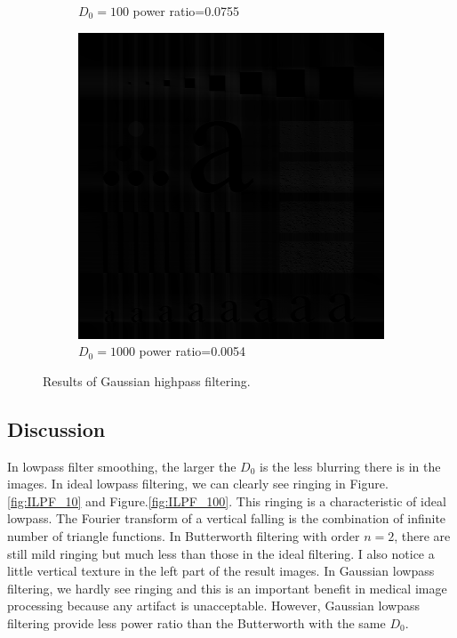 \begin{figure}[h!]
\begin{subfigure}[b]{0.3\linewidth}
		\caption{$D_0=100$ power ratio=0.0755}
		\label{fig:GHPF_100}
	\end{subfigure}
	\begin{subfigure}[b]{0.3\linewidth}
		\includegraphics[width=\linewidth]{myfigure/p3/GHPF_1000.png}
		\caption{$D_0=1000$ power ratio=0.0054}
		\label{fig:GHPF_1000}
	\end{subfigure}
  	\caption{Results of Gaussian highpass filtering.}
  	\label{fig:GHPF}
\end{figure}


\subsection{Discussion}
In lowpass filter smoothing, the larger the $D_0$ is the less blurring there is in the images. In ideal lowpass filtering, we can clearly see ringing in Figure.\ref{fig:ILPF_10} and Figure.\ref{fig:ILPF_100}. This ringing is a characteristic of ideal lowpass. The Fourier transform of a vertical falling is the combination of infinite number of triangle functions. In Butterworth filtering with order $n=2$, there are still mild ringing but much less than those in the ideal filtering. I also notice a little vertical texture in the left part of the result images. In Gaussian lowpass filtering, we hardly see ringing and this is an important benefit in medical image processing because any artifact is unacceptable. However, Gaussian lowpass filtering provide less power ratio than the Butterworth with the same $D_0$. \\

